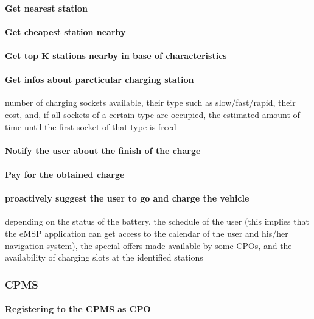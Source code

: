 \paragraph{Get nearest station}

\paragraph{Get cheapest station nearby}

\paragraph{Get top K stations nearby in base of characteristics}
\paragraph{Get infos about parcticular charging station}
number of charging sockets available, their type such as slow/fast/rapid, their cost, and, if all sockets of a certain type are occupied, the estimated amount of time until the first socket of that type is freed

\paragraph{Notify the user about the finish of the charge}

\paragraph{Pay for the obtained charge}

\paragraph{proactively suggest the user to go and charge the vehicle}
depending on the status of the
battery, the schedule of the user (this implies that the eMSP application can get access to the
calendar of the user and his/her navigation system), the special offers made available by some
CPOs, and the availability of charging slots at the identified stations

\subsubsection{\ac{CPMS}}
\paragraph{Registering to the \ac{CPMS} as \ac{CPO}}
